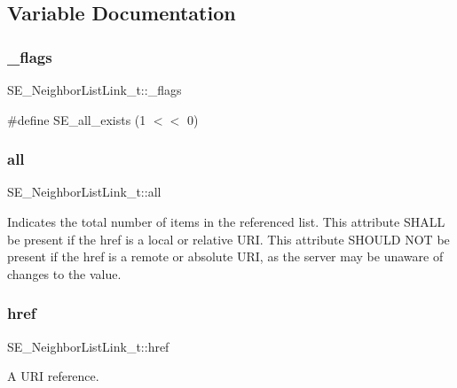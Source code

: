 \subsection{Variable Documentation}
\mbox{\label{group__NeighborListLink_gaba3f6f896c85e0c25653154019dd1471}} 
\subsubsection{\texorpdfstring{\+\_\+flags}{\_flags}}
{\footnotesize\ttfamily S\+E\+\_\+\+Neighbor\+List\+Link\+\_\+t\+::\+\_\+flags}

\#define S\+E\+\_\+all\+\_\+exists (1 $<$$<$ 0) \mbox{\label{group__NeighborListLink_gabbd6ebe746c9d4582fc7f972ac1be6c5}} 
\subsubsection{\texorpdfstring{all}{all}}
{\footnotesize\ttfamily S\+E\+\_\+\+Neighbor\+List\+Link\+\_\+t\+::all}

Indicates the total number of items in the referenced list. This attribute S\+H\+A\+LL be present if the href is a local or relative U\+RI. This attribute S\+H\+O\+U\+LD N\+OT be present if the href is a remote or absolute U\+RI, as the server may be unaware of changes to the value. \mbox{\label{group__NeighborListLink_ga5486b4efff053b4817879fd020db5f42}} 
\subsubsection{\texorpdfstring{href}{href}}
{\footnotesize\ttfamily S\+E\+\_\+\+Neighbor\+List\+Link\+\_\+t\+::href}

A U\+RI reference. 